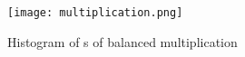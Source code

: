 \begin{figure}[hp]
  \centering
  \texttt{[image: multiplication.png]}
  \caption{Histogram of \hammingw{}s of balanced multiplication}
  \label{fig:mult}
\end{figure}




